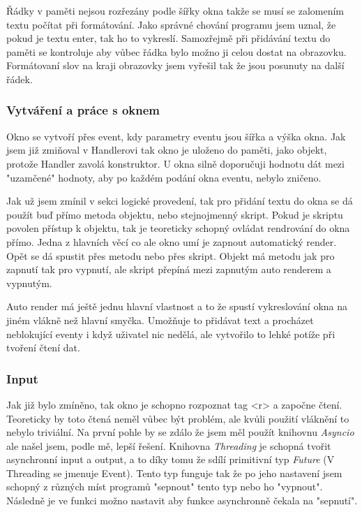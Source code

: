 \documentclass[12pt,a4paper]{article}
\begin{document}
Řádky v paměti nejsou rozřezány podle šířky okna takže se musí se zalomením textu počítat při formátování. Jako správné chování programu jsem uznal, že pokud je textu enter, tak ho to vykreslí. Samozřejmě při přidávání textu do paměti se kontroluje aby vůbec řádka bylo možno ji celou dostat na obrazovku. Formátovaní slov na kraji obrazovky jsem vyřešil tak že jsou posunuty na další řádek.
\subsubsection{Vytváření a práce s oknem}
Okno se vytvoří přes event, kdy parametry eventu jsou šířka a výška okna. Jak jsem již zmiňoval v Handlerovi tak okno je uloženo do paměti, jako objekt, protože Handler zavolá konstruktor. U okna silně doporučuji hodnotu dát mezi "uzamčené" hodnoty, aby po každém podání okna eventu, nebylo zničeno.

Jak už jsem zmínil v sekci logické provedení, tak pro přidání textu do okna se dá použít buď přímo metoda objektu, nebo stejnojmenný skript. Pokud je skriptu povolen přístup k objektu, tak je teoreticky schopný ovládat rendrování do okna přímo. Jedna z hlavních věcí co ale okno umí je zapnout automatický render. Opět se dá spustit přes metodu nebo přes skript. Objekt má metodu jak pro zapnutí tak pro vypnutí, ale skript přepíná mezi zapnutým auto renderem a vypnutým. 

Auto render má ještě jednu hlavní vlastnost a to že spustí vykreslování okna na jiném vlákně než hlavní smyčka. Umožňuje to přidávat text a procházet neblokující eventy i když uživatel nic nedělá, ale vytvořilo to lehké potíže při tvoření čtení dat.

\subsubsection{Input}
Jak již bylo zmíněno, tak okno je schopno rozpoznat tag <r> a započne čtení. Teoreticky by toto čtená neměl vůbec být problém, ale kvůli použití vláknění to nebylo triviální. Na první pohle by se zdálo že jsem měl použít knihovnu \textit{Asyncio} ale našel jsem, podle mě, lepší řešení. Knihovna \textit{Threading} je schopná tvořit asynchronní input a output, a to díky tomu že sdílí primitivní typ \textit{Future} (V Threading se jmenuje Event). Tento typ funguje tak že po jeho nastavení jsem schopný z různých míst programů "sepnout" tento typ nebo ho "vypnout". Následně je ve funkci možno nastavit aby funkce asynchronně čekala na "sepnutí".
\end{document}
